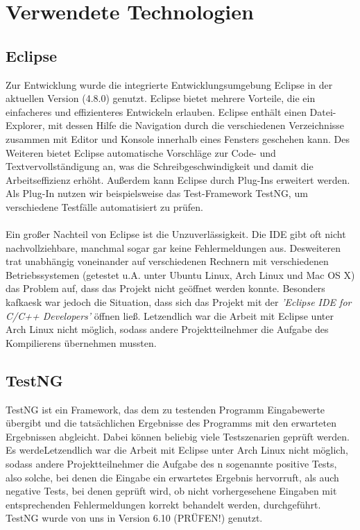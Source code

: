 
\section{Verwendete Technologien}

\subsection{Eclipse}
Zur Entwicklung wurde die integrierte Entwicklungsumgebung Eclipse in der aktuellen Version (4.8.0) genutzt. 
Eclipse bietet mehrere Vorteile, die ein einfacheres und effizienteres Entwickeln erlauben. Eclipse enthält einen Datei-Explorer, mit dessen Hilfe die Navigation durch die verschiedenen Verzeichnisse zusammen mit Editor und Konsole innerhalb eines Fensters geschehen kann. Des Weiteren bietet Eclipse automatische Vorschläge zur Code- und Textvervollständigung an, was die Schreibgeschwindigkeit und damit die Arbeitseffizienz erhöht. 
Außerdem kann Eclipse durch Plug-Ins erweitert werden. Als Plug-In nutzen wir beispielsweise das Test-Framework TestNG, um verschiedene Testfälle automatisiert zu prüfen.
\\\\
Ein großer Nachteil von Eclipse ist die Unzuverlässigkeit. Die IDE gibt oft nicht nachvollziehbare, manchmal sogar gar keine Fehlermeldungen aus. Desweiteren trat unabhängig voneinander auf verschiedenen Rechnern mit verschiedenen Betriebssystemen (getestet u.A. unter Ubuntu Linux, Arch Linux und Mac OS X) das Problem auf, dass das Projekt nicht geöffnet werden konnte. Besonders kafkaesk war jedoch die Situation, dass sich das Projekt mit der \textit{'Eclipse IDE for C/C++ Developers'} öffnen ließ. Letzendlich war die Arbeit mit Eclipse unter Arch Linux nicht möglich, sodass andere Projektteilnehmer die Aufgabe des Kompilierens übernehmen mussten.

\subsection{TestNG}
TestNG ist ein Framework, das dem zu testenden Programm Eingabewerte übergibt und die tatsächlichen Ergebnisse des Programms mit den erwarteten Ergebnissen abgleicht. Dabei können beliebig viele Testszenarien geprüft werden. Es werdeLetzendlich war die Arbeit mit Eclipse unter Arch Linux nicht möglich, sodass andere Projektteilnehmer die Aufgabe des n sogenannte positive Tests, also solche, bei denen die Eingabe ein erwartetes Ergebnis hervorruft, als auch negative Tests, bei denen geprüft wird, ob nicht vorhergesehene Eingaben mit entsprechenden Fehlermeldungen korrekt behandelt werden, durchgeführt. TestNG wurde von uns in Version 6.10 (PRÜFEN!) genutzt.

